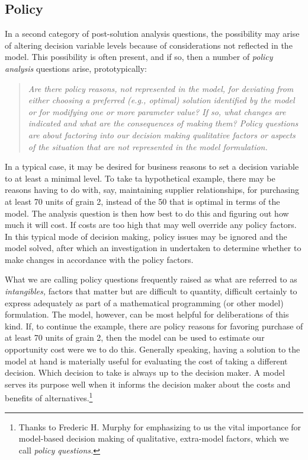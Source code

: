 \subsection{Policy}

In a second category of post-solution analysis questions, the possibility may arise of altering decision variable levels because of considerations not reflected in the model. This possibility is  often present, and 
if so, then a number of \emph{policy analysis} questions arise, prototypically:

\begin{quote}
{\it Are there policy reasons, not represented in the model, for deviating  from either choosing a preferred (e.g., optimal) solution identified by the model or for modifying one or more parameter value? If so, what changes are indicated and what are the consequences of making them? Policy questions are about factoring into our decision making qualitative factors or aspects of the situation that are not represented in the model formulation.
}
\end{quote}
In a typical case, it may be desired for business reasons to set a decision variable to at least a minimal level. To take ta hypothetical example, there may be reasons having to do with, say, maintaining supplier relationships, for purchasing at least 70 units of grain 2, instead of the 50 that is optimal in terms of the model. The analysis question is then how best to do this and figuring out how much it will cost. If costs are too high that may well override any policy factors. In this typical mode of decision making, policy issues may be ignored and the model solved, after which an investigation in undertaken to determine whether to make changes in accordance with the policy factors.

What we are calling policy questions  frequently raised as what are referred to as \emph{intangibles,} factors that matter but are difficult to quantity, difficult certainly to express adequately  as part of a mathematical programming (or other model) formulation.  The model, however, can be most helpful for deliberations of this kind. If, to continue the example, there are policy reasons for favoring purchase of at least 70 units of grain 2, then the model can be used to estimate our opportunity cost were we to do this. Generally speaking, having a solution to the model at hand is materially useful for evaluating the cost of taking a different decision. Which decision to take is always up to the decision maker. A model serves its purpose well when it informs the decision maker about the costs and benefits of alternatives.\footnote{Thanks to Frederic H. Murphy for emphasizing to us the vital importance for model-based decision making of qualitative, extra-model factors, which we call \emph{policy questions.}}

